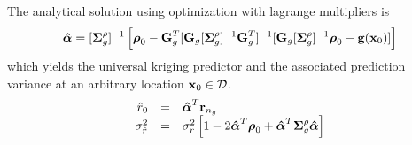 The analytical solution using optimization with lagrange multipliers is
\begin{equation*}
    \boldsymbol{\mathbf{\hat{\alpha}}} = [\boldsymbol{\mathbf{\Sigma}}_g^\rho]^{-1}\left[\boldsymbol{\mathbf{\rho}}_0 - \boldsymbol{\mathbf{G}}_g^T [\boldsymbol{\mathbf{G}}_g[\boldsymbol{\mathbf{\Sigma}}_g^\rho]^{-1}\boldsymbol{\mathbf{G}}_g^T]^{-1}[\boldsymbol{\mathbf{G}}_g[\boldsymbol{\mathbf{\Sigma}}_g^\rho]^{-1}\boldsymbol{\mathbf{\rho}}_0 - \boldsymbol{\mathbf{g}}(\boldsymbol{\mathbf{x}}_0)]\right]
\end{equation*}
which yields the universal kriging predictor and the associated prediction variance at an
arbitrary location $\boldsymbol{\mathbf{x}}_0 \in \mathcal{D}$.
\begin{equation}
    \begin{array}{rcl}
         \hat{r}_0 & = & \boldsymbol{\mathbf{\hat{\alpha}}}^T \boldsymbol{\mathbf{r}}_{n_g}  \\
         \sigma_{\hat{r}}^2 & = & \sigma_r^2\left[1-2\boldsymbol{\mathbf{\hat{\alpha}}}^T \boldsymbol{\mathbf{\rho}}_0 + \boldsymbol{\mathbf{\hat{\alpha}}}^T\boldsymbol{\mathbf{\Sigma}}_g^\rho \boldsymbol{\mathbf{\hat{\alpha}}}\right] 
    \end{array}
\end{equation}
